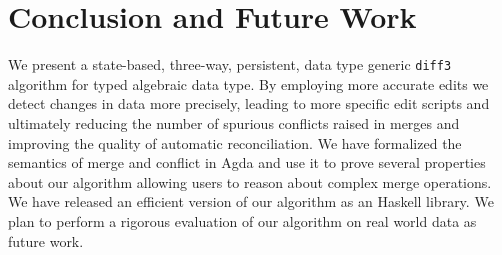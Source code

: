 \documentclass{sigplanconf}
\theoremstyle{plain}
\begin{document}

\section{Conclusion and Future Work}
\label{sec:conclusion}
We present a state-based, three-way, persistent, data type generic
\texttt{diff3} algorithm for typed algebraic data type.
%
By employing more accurate edits we detect changes in data more
precisely, leading to more specific edit scripts and ultimately
reducing the number of spurious conflicts raised in merges and
improving the quality of automatic reconciliation.
%
We have formalized the semantics of merge and conflict in Agda and
use it to prove several properties about our algorithm allowing
users to reason about complex merge operations.
%
We have released an efficient version of our algorithm as an Haskell
library.
%
We plan to perform a rigorous evaluation of our algorithm on real
world data as future work.
%














\listoftodos
\end{document}
